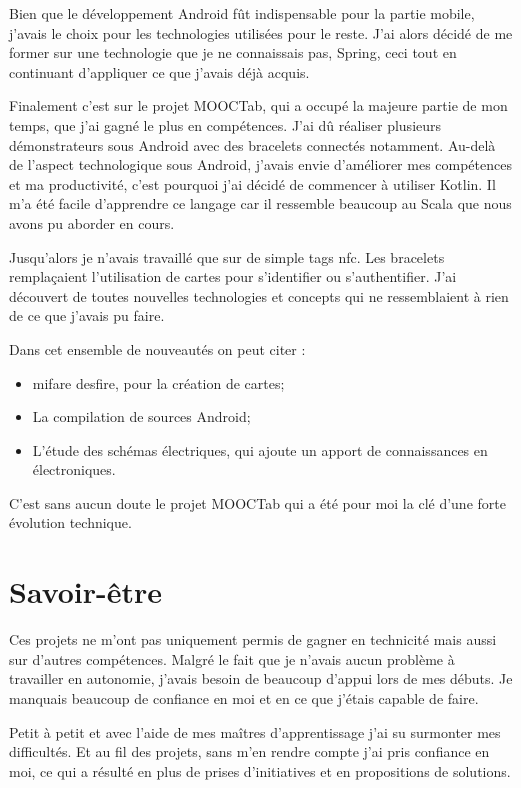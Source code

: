 \documentclass[french,12pt,a4paper,titlepage,openright,openbib]{report}
\begin{document}
Bien que le développement Android fût indispensable pour la partie mobile, j'avais le choix pour les technologies utilisées pour le reste. J'ai alors décidé de me former sur une technologie que je ne connaissais pas, Spring, ceci tout en continuant d'appliquer ce que j'avais déjà acquis.

Finalement c'est sur le projet MOOCTab, qui a occupé la majeure partie de mon temps, que j'ai gagné le plus en compétences. J'ai dû réaliser plusieurs démonstrateurs sous Android avec des bracelets connectés notamment.
Au-delà de l'aspect technologique sous Android, j'avais envie d'améliorer mes compétences et ma productivité, c'est pourquoi j'ai décidé de commencer à utiliser Kotlin. Il m'a été facile d'apprendre ce langage car il ressemble beaucoup au Scala que nous avons pu aborder en cours. 

Jusqu'alors je n'avais travaillé que sur de simple tags \gls{nfc}. Les bracelets remplaçaient l'utilisation de cartes pour s'identifier ou s'authentifier. 
J'ai découvert de toutes nouvelles technologies et concepts qui ne ressemblaient à rien de ce que j'avais pu faire.
\par
Dans cet ensemble de nouveautés on peut citer :
\begin{itemize}
\item \gls{mifare} \gls{desfire}, pour la création de cartes;
\item La compilation de sources Android;
\item L'étude des schémas électriques, qui ajoute un apport de connaissances en électroniques.
\end{itemize}

\par

C'est sans aucun doute le projet MOOCTab qui a été pour moi la clé d'une forte évolution technique.
\section{Savoir-être}
Ces projets ne m'ont pas uniquement permis de gagner en technicité mais aussi sur d'autres compétences.
Malgré le fait que je n'avais aucun problème à travailler en autonomie, j'avais besoin de beaucoup d'appui lors de mes débuts. Je manquais beaucoup de confiance en moi et en ce que j'étais capable de faire.

Petit à petit et avec l'aide de mes maîtres d'apprentissage j'ai su surmonter mes difficultés.
Et au fil des projets, sans m'en rendre compte j'ai pris confiance en moi, ce qui a résulté en plus de prises d'initiatives et en propositions de solutions.
\end{document}
